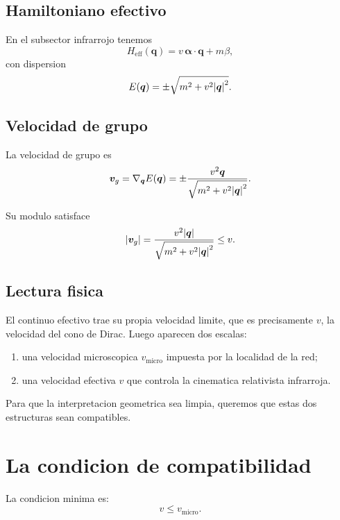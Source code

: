 \subsection{Hamiltoniano efectivo}
En el subsector infrarrojo tenemos
\begin{equation}
H_{\text{eff}}(\bm{q}) = v\,\bm{\alpha}\cdot\bm{q} + m\beta,
\label{c19:eq:Heff}
\end{equation}
con dispersion
\begin{equation}
E(\bm{q})=\pm\sqrt{m^2+v^2\abs{\bm{q}}^2}.
\label{c19:eq:dispdirac}
\end{equation}

\subsection{Velocidad de grupo}
La velocidad de grupo es
\begin{equation}
\bm{v}_g = \nabla_{\bm{q}} E(\bm{q})
= \pm \frac{v^2 \bm{q}}{\sqrt{m^2+v^2\abs{\bm{q}}^2}}.
\label{c19:eq:vg}
\end{equation}

Su modulo satisface
\begin{equation}
\abs{\bm{v}_g}
=
\frac{v^2\abs{\bm{q}}}{\sqrt{m^2+v^2\abs{\bm{q}}^2}}
\le v.
\label{c19:eq:vgbound}
\end{equation}

\subsection{Lectura fisica}
El continuo efectivo trae su propia velocidad limite, que es precisamente \(v\), la velocidad del cono de Dirac. Luego aparecen dos escalas:
\begin{enumerate}[label=\arabic*.]
    \item una velocidad microscopica \(v_{\text{micro}}\) impuesta por la localidad de la red;
    \item una velocidad efectiva \(v\) que controla la cinematica relativista infrarroja.
\end{enumerate}

Para que la interpretacion geometrica sea limpia, queremos que estas dos estructuras sean compatibles.

\section{La condicion de compatibilidad}
La condicion minima es:
\begin{equation}
v \le v_{\text{micro}}.
\label{c19:eq:compat}
\end{equation}

